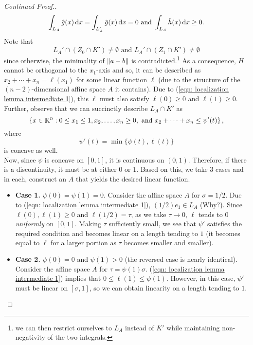 \begin{proof}[Continued Proof.]
	\[ \int_{L_A}\hat{g}(x)\operatorname{d}\!{x} = \int_{L_A'}\hat{g}(x)\operatorname{d}\!{x} = 0 \text{ and } \int_{L_A}\hat{h}(x)\operatorname{d}\!{x} \geq 0. \]
	Note that
	\begin{equation*}
	\tag{$*$}
	\label{eqn: localization lemma intermediate 1}
		L_A'\cap (Z_0\cap K')\neq\emptyset \text{ and } L_A'\cap (Z_1\cap K')\neq\emptyset
	\end{equation*}
	since otherwise, the minimality of $\left\lVert a-b\right\rVert$ is contradicted.\footnote{we can then restrict ourselves to $L_A$ instead of $K'$ while maintaining non-negativity of the two integrals.} As a consequence, $H$ cannot be orthogonal to the $x_1$-axis and so, it can be described as $x_2+\cdots+x_n=\ell(x_1)$ for some linear function $\ell$ (due to the structure of the $(n-2)$-dimensional affine space $A$ it contains). Due to (\ref{eqn: localization lemma intermediate 1}), this $\ell$ must also satisfy $\ell(0)\geq 0$ and $\ell(1)\geq 0$. Further, observe that we can succinctly describe $L_A\cap K'$ as
	\[ \left\{x\in\mathbb{R}^n : 0 \leq x_1 \leq 1, x_2,\ldots,x_n\geq 0, \text{ and } x_2+\cdots+x_n \leq \psi'(t) \right\}, \]
	where
	\[ \psi'(t) = \min\{\psi(t),\ell(t)\} \]
	is concave as well.\\

	Now, since $\psi$ is concave on $[0,1]$, it is continuous on $(0,1)$. Therefore, if there is a discontinuity, it must be at either $0$ or $1$. Based on this, we take $3$ cases and in each, construct an $A$ that yields the desired linear function.
	\begin{itemize}
		\item \textbf{Case 1.} $\psi(0)=\psi(1)=0$. Consider the affine space $A$ for $\sigma=1/2$. Due to (\ref{eqn: localization lemma intermediate 1}), $(1/2) e_1 \in L_A$ (Why?). Since $\ell(0),\ell(1)\geq 0$ and $\ell(1/2)=\tau$, as we take $\tau\to 0$, $\ell$ tends to $0$ \textit{uniformly} on $[0,1]$. Making $\tau$ sufficiently small, we see that $\psi'$ satisfies the required condition and becomes linear on a length tending to $1$ (it becomes equal to $\ell$ for a larger portion as $\tau$ becomes smaller and smaller).

		\item \textbf{Case 2.} $\psi(0)=0$ and $\psi(1)>0$ (the reversed case is nearly identical). Consider the affine space $A$ for $\tau=\psi(1)\sigma$. (\ref{eqn: localization lemma intermediate 1}) implies that $0\leq\ell(1)\leq\psi(1)$. However, in this case, $\psi'$ must be linear on $[\sigma,1]$, so we can obtain linearity on a length tending to $1$.


\end{itemize}
\end{proof}
